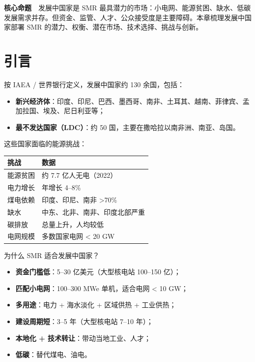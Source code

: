 \documentclass[
  UTF8,
  scheme=plain,
  fontsize=10pt,
  openany
]{ctexbook}
\begin{document}
\begin{epigraph}

\textbf{核心命题}　发展中国家是 SMR
最具潜力的市场：小电网、能源贫困、缺水、低碳发展需求并存。但资金、监管、人才、公众接受度是主要障碍。本章梳理发展中国家部署
SMR 的潜力、权衡、潜在市场、技术选择、挑战与创新。

\end{epigraph}

\section{引言}\label{ux5f15ux8a00-19}

按 IAEA / 世界银行定义，发展中国家约 130 余国，包括：

\begin{itemize}
\tightlist
\item
  \textbf{新兴经济体}：印度、印尼、巴西、墨西哥、南非、土耳其、越南、菲律宾、孟加拉国、埃及、尼日利亚等；
\item
  \textbf{最不发达国家（LDC）}：约 50
  国，主要在撒哈拉以南非洲、南亚、岛国。
\end{itemize}

这些国家面临的能源挑战：

{\def\LTcaptype{none} %
\begin{longtable}[]{@{}ll@{}}
\toprule\noalign{}
挑战 & 数据 \\
\midrule\noalign{}
\endhead
\bottomrule\noalign{}
\endlastfoot
能源贫困 & 约 7.7 亿人无电（2022） \\
电力增长 & 年增长 4--8\% \\
煤电依赖 & 印度、印尼、南非 \textgreater70\% \\
缺水 & 中东、北非、南非、印度北部严重 \\
碳排放 & 总量上升，人均较低 \\
电网规模 & 多数国家电网 \textless{} 20 GW \\
\end{longtable}
}

为什么 SMR 适合发展中国家？

\begin{itemize}
\tightlist
\item
  \textbf{资金门槛低}：5--30 亿美元（大型核电站 100--150 亿）；
\item
  \textbf{匹配小电网}：100--300 MWe 单机，适合电网 \textless{} 10 GW；
\item
  \textbf{多用途}：电力 + 海水淡化 + 区域供热 + 工业供热；
\item
  \textbf{建设周期短}：3--5 年（大型核电站 7--10 年）；
\item
  \textbf{本地化 + 技术转让}：带动当地工业、人才；
\item
  \textbf{低碳}：替代煤电、油电。
\end{itemize}
\end{document}

